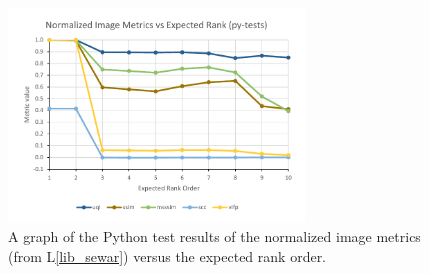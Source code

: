 \documentclass[12pt, titlepage]{article}
\newcommand{\lref}[1]{L\ref{#1}}
\begin{document}
\begin{figure}[h!]
  \begin{center}
  \includegraphics[width=0.7\textwidth]{test-analysis/py-graph.pdf}
  \caption{A graph of the Python test results of the normalized
  image metrics (from \lref{lib_sewar}) versus the expected rank order.}
  \label{fig_py_graph}
  \end{center}
\end{figure}


\newpage
\clearpage
\end{document}
